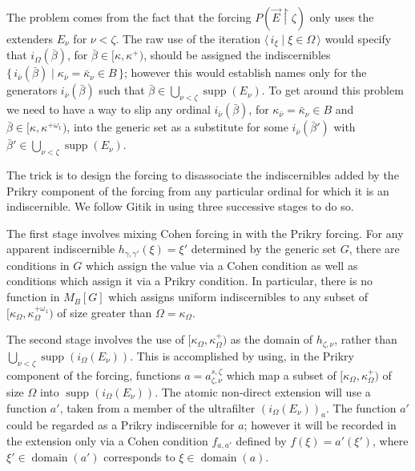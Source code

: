 \documentclass[
twoside,
]{article}
\theoremstyle{definition}
\theoremstyle{remark}
\newcommand{\ufFromExt}[2]{(#1)_{#2}}
\newcommand{\forceKappa}{\bar\kappa} %
\DeclareMathOperator{\supp}{supp}   %
\newcommand{\ords}{\Omega}
\newcommand{\set}[1]{\{\,#1\,\}}
\newcommand{\pair}[1]{\langle#1\rangle}
\newcommand{\seq}[1]{\pair{\,#1\,}}
\newcommand{\restrict}{{\upharpoonright}}
\DeclareMathOperator{\domain}{domain}
\begin{document}
  The problem comes from the fact that the forcing $P(\vec E\restrict\zeta)$ only uses
  the extenders $E_{\nu}$ for $\nu<\zeta$.  The raw use of the
  iteration $\seq{i_{\xi}\mid\xi\in\ords}$ would specify that 
  $i_{\ords}(\bar\beta)$, for $\bar\beta\in[\kappa,\kappa^{+})$,
  should be assigned the indiscernibles 
  $\set{i_{\bar\nu}(\bar\beta)\mid
    \kappa_{\bar\nu}=\forceKappa_{\nu}\in B}$; however this would
  establish names only for the generators  $i_{\bar 
    \nu}(\bar\beta)$ such that 
  $\bar\beta\in\bigcup_{\nu<\zeta}\supp(E_{\nu})$.  To get around this
  problem we need to have a way to slip any ordinal 
  $i_{\bar\nu}(\bar \beta)$, for $\kappa_{\bar\nu}=\forceKappa_{\nu}\in
  B$ and 
  $\bar\beta\in[\kappa,\kappa^{+\omega_1})$, 
  into the generic set as a 
  substitute for some $i_{\bar{\nu}}(\bar\beta')$ with $\bar\beta'\in\bigcup_{\nu<\zeta}\supp(E_\nu)$.

  
  The trick is to design the forcing to disassociate the
  indiscernibles added by the Prikry component of the forcing from
  any particular ordinal for which it is an indiscernible.  
  We follow Gitik
  \cite{Gitik2002Blowing-up-powe,Gitik2005No-bound-for-th,
    Gitik2010Prikry-type-for,Gitik2012Violating-the-s}
  in using three successive stages to do so.  

 The first stage involves mixing Cohen forcing in  with the
 Prikry forcing.      For any apparent indiscernible
 $h_{\gamma,\gamma'}(\xi)=\xi'$ determined by the
 generic set $G$, there are conditions in $G$ which
 assign the value via a Cohen condition as well as conditions which assign
 it via a Prikry condition.
 In particular, there is no function in $M_B[G]$ which
 assigns uniform indiscernibles to any subset of
 $[\kappa_\ords,\kappa_{\ords}^{+\omega_1})$ of size greater than $\ords=\kappa_{\ords}$.


 The second stage involves the use of
 $[\kappa_\ords,\kappa_{\ords}^{+})$ as the domain of
 $h_{\zeta,\nu}$, rather than
 $\bigcup_{\nu<\zeta}\supp(i_{\ords}(E_{\nu}))$.
 This is accomplished by using, in the Prikry component of the forcing,
 functions 
 $a=a^{s,\zeta}_{\zeta,\nu}$ which map  a subset of $[\kappa_{\ords},\kappa_{\ords}^{+})$
 of size $\ords$ into $\supp(i_{\ords}(E_{\nu}))$.  
 The atomic non-direct extension will use a function $a'$, taken from
 a member of the ultrafilter $\ufFromExt{i_\ords(E_\nu)}{a}$. 
 The function $a'$ could be regarded as a Prikry indiscernible for
 $a$; however it will be recorded in the
 extension only via a Cohen condition $f_{a, a'}$
 defined by $f(\xi)=a'(\xi')$, where $\xi'\in\domain(a')$ corresponds
 to $\xi\in\domain(a)$.   
\end{document}
